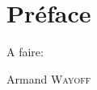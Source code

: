 \pageblanche

\chapter*{Préface}


A faire:


\begin{flushright}
	Armand \textsc{Wayoff}
\end{flushright}
